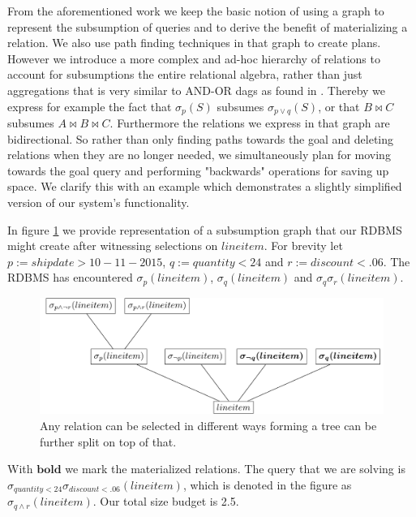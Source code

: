 From the aforementioned work we keep the basic notion of using a graph
to represent the subsumption of queries and to derive the benefit of
materializing a relation. We also use path finding techniques in that
graph to create plans. However we introduce a more complex and ad-hoc
hierarchy of relations to account for subsumptions the entire
relational algebra, rather than just aggregations that is very similar
to AND-OR dags as found in
\cite{mistryMaterializedViewSelection2001}. Thereby we express for
example the fact that \(\sigma_p(S)\) subsumes \(\sigma_{p \lor q}(S)\),
or that \(B \Join C\) subsumes \(A \Join B \Join C\). Furthermore the
relations we express in that graph are bidirectional. So rather than
only finding paths towards the goal and deleting relations when they
are no longer needed, we simultaneously plan for moving towards the
goal query and performing "backwards" operations for saving up
space. We clarify this with an example which demonstrates a slightly
simplified version of our system's functionality.

In figure \ref{fig:intro_selectexample} we provide representation of a subsumption
graph that our RDBMS might create after witnessing selections on
\(lineitem\). For brevity let \(p:=shipdate > 10-11-2015\),
\(q:=quantity < 24\) and \(r:=discount < .06\). The RDBMS has
encountered \(\sigma_{p}(lineitem)\), \(\sigma_{q}(lineitem)\) and
\(\sigma_{q} \sigma_{r} (lineitem)\).

\begin{figure}[H]
  \centering
  \includegraphics[width=.9\linewidth]{./imgs/intro_selectexample.pdf}
  \caption{\label{fig:intro_selectexample}Any relation can be selected
    in different ways forming a tree can be further split on top of
    that.}
\end{figure}

With \(\boldsymbol{bold}\) we mark the materialized relations. The query
that we are solving is \(\sigma_{quantity < 24} \sigma_{discount < .06}
(lineitem)\), which is denoted in the figure as \(\sigma_{q \land
  r}(lineitem)\). Our total size budget is 2.5.

